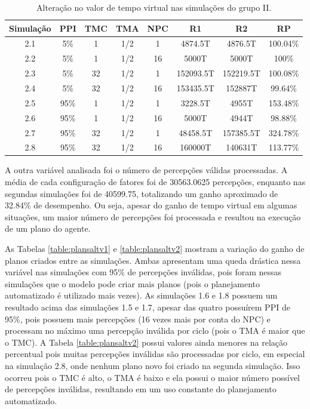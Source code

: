 \begin{table}
    \begin{center}
        \caption{ Alteração no valor de tempo virtual nas simulações do grupo II. }
        \label{table:vtaltv2}
        \begin{tabular}{ |c|c|c|c|c|c|c|c| }
            \hline
            \textbf{Simulação} & \textbf{PPI} & \textbf{TMC} & \textbf{TMA} & \textbf{NPC} & \textbf{R1} & \textbf{R2} & \textbf{RP}\\
            \hline
            2.1 & 5\% & 1 & 1/2 & 1 & 4874.5T & 4876.5T & 100.04\%\\
            \hline
            2.2 & 5\% & 1 & 1/2 & 16 & 5000T & 5000T & 100\%\\
            \hline
            2.3 & 5\% & 32 & 1/2 & 1 & 152093.5T & 152219.5T & 100.08\%\\
            \hline
            2.4 & 5\% & 32 & 1/2 & 16 & 153435.5T & 152887T & 99.64\%\\
            \hline
            2.5 & 95\% & 1 & 1/2 & 1 & 3228.5T & 4955T & 153.48\%\\
            \hline
            2.6 & 95\% & 1 & 1/2 & 16 & 5000T & 4944T & 98.88\%\\
            \hline
            2.7 & 95\% & 32 & 1/2 & 1 & 48458.5T & 157385.5T & 324.78\%\\
            \hline
            2.8 & 95\% & 32 & 1/2 & 16 & 160000T & 140631T & 113.77\%\\
            \hline
            
        \end{tabular}{}
    \end{center}{}
\end{table}

A outra variável analisada foi o número de percepções válidas processadas. A média de cada configuração de fatores foi de 30563.0625 percepções, enquanto nas segundas simulações foi de 40599.75, totalizando um ganho aproximado de 32.84\% de desempenho. Ou seja, apesar do ganho de tempo virtual em algumas situações, um maior número de percepções foi processada e resultou na execução de um plano do agente.

As Tabelas \ref{table:plansaltv1} e \ref{table:plansaltv2} mostram a variação do ganho de planos criados entre as simulações. Ambas apresentam uma queda drástica nessa variável nas simulações com 95\% de percepções inválidas, pois foram nessas simulações que o modelo pode criar mais planos (pois o planejamento automatizado é utilizado mais vezes). As simulações 1.6 e 1.8 possuem um resultado acima das
simulações 1.5 e 1.7, apesar das quatro possuírem PPI de 95\%, pois possuem mais percepções (16 vezes mais por conta do NPC) e processam no máximo uma percepção inválida por ciclo (pois o TMA é maior que o TMC).
A Tabela \ref{table:plansaltv2} possui valores ainda menores na relação percentual pois muitas percepções inválidas são processadas por ciclo, em especial na simulação 2.8, onde nenhum plano novo foi criado na segunda simulação. Isso ocorreu pois o TMC é alto, o TMA é baixo e ela possui o maior número possível de percepções inválidas, resultando em um uso constante do planejamento automatizado.

